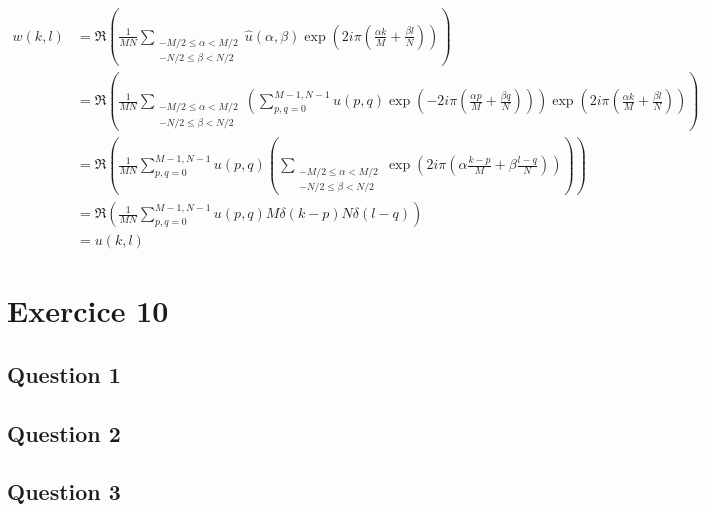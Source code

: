 \documentclass[12pt,a4paper,onecolumn]{article}
\begin{document}
\begin{equation}
	\begin{split}
		w(k,l) &= \Re\left(\frac{1}{MN}\sum_{\substack{-M/2 \le \alpha < M/2\\ -N/2 \le \beta < N/2}}  \widehat{u}(\alpha, \beta) \exp\left(2i\pi(\frac{\alpha k}{M} + \frac{\beta l}{N})\right) \right) \\
		&= \Re\left(\frac{1}{MN}\sum_{\substack{-M/2 \le \alpha < M/2\\ -N/2 \le \beta < N/2}}  \left( \sum_{p, q = 0}^{M-1, N-1}u(p, q)\exp\left(-2i\pi(\frac{\alpha p}{M} + \frac{\beta q}{N})\right)\right) \exp\left(2i\pi(\frac{\alpha k}{M} + \frac{\beta l}{N})\right) \right)\\
		&= \Re\left(\frac{1}{MN} \sum_{p, q = 0}^{M-1, N-1}u(p, q) \left( \sum_{\substack{-M/2 \le \alpha < M/2\\ -N/2 \le \beta < N/2}} \exp\left(2i\pi(\alpha \frac{k - p}{M} + \beta\frac{l-q}{N})\right)\right)\right)\\
		&= \Re\left(\frac{1}{MN} \sum_{p, q = 0}^{M-1, N-1}u(p, q) M\delta(k-p)N\delta(l-q)\right)\\
		&= u(k,l)
	\end{split}
\end{equation}

\section{Exercice 10}

\subsection{Question 1}

\subsection{Question 2}

\subsection{Question 3}
\end{document}

